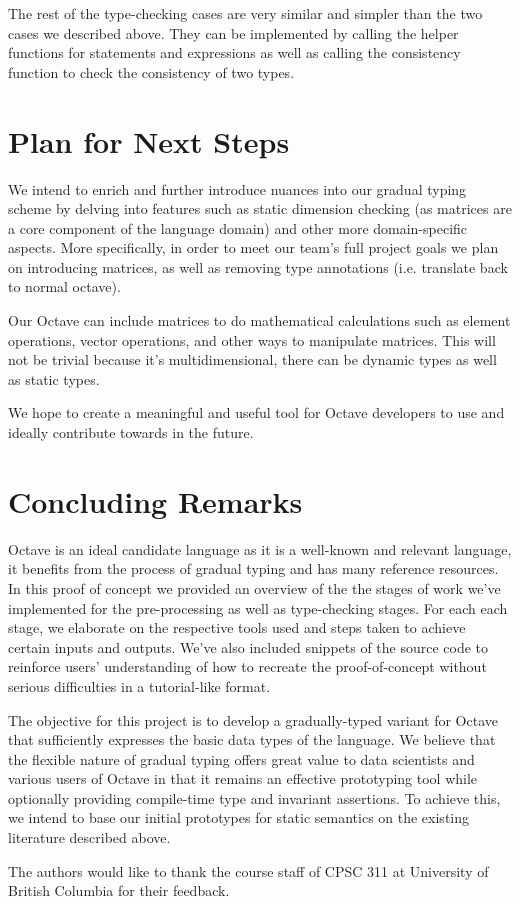 The rest of the type-checking cases are very similar and simpler than the two cases we described above. They can be implemented by calling the helper functions for statements and expressions as well as calling the consistency function to check the consistency of two types.

\section{Plan for Next Steps}
We intend to enrich and further introduce nuances into our gradual typing scheme by delving into features such as static dimension checking (as matrices are a core component of the language domain) and other more domain-specific aspects. More specifically, in order to meet our team's full project goals we plan on introducing matrices, as well as removing type annotations (i.e. translate back to normal octave).

Our Octave can include matrices to do mathematical calculations such as element operations, vector operations, and other ways to manipulate matrices. This will not be trivial because it's multidimensional, there can be dynamic types as well as static types.

We hope to create a meaningful and useful tool for Octave developers to use and ideally contribute towards in the future.

\section{Concluding Remarks}
Octave is an ideal candidate language as it is a well-known and relevant language, it benefits from the process of gradual typing and has many reference resources. In this proof of concept we provided an overview of the the stages of work we've implemented for the pre-processing as well as type-checking stages. For each each stage, we elaborate on the respective tools used and steps taken to achieve certain inputs and outputs. We've also included snippets of the source code to reinforce users' understanding of how to recreate the proof-of-concept without serious difficulties in a tutorial-like format.

The objective for this project is to develop a gradually-typed variant for Octave that sufficiently expresses the basic data types of the language. We believe that the flexible nature of gradual typing offers great value to data scientists and various users of Octave in that it remains an effective prototyping tool while optionally providing compile-time type and invariant assertions. To achieve this, we intend to base our initial prototypes for static semantics on the existing literature described above.

\appendix

\begin{acks}
    The authors would like to thank the course staff of CPSC 311 at University
    of British Columbia for their feedback.
\end{acks}
